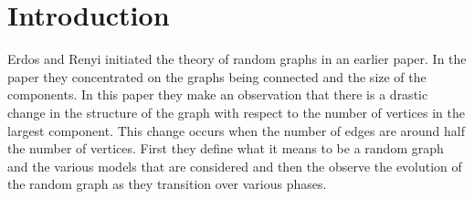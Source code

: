 \section{Introduction}
Erdos and Renyi initiated the theory of random graphs in an earlier paper. In the paper they concentrated on the graphs being connected and the size of the components. In this paper they make an observation that there is a drastic change in the structure of the graph with respect to the number of vertices in the largest component. This change occurs when the number of edges are around half the number of vertices. First they define what it means to be a random graph and the various models that are considered and then the observe the evolution of the random graph as they transition over various phases.